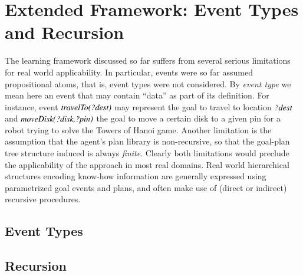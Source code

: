 \section{Extended Framework: Event Types and Recursion}\label{sec:extended}

 The learning framework discussed so far suffers from several serious limitations
for real world applicability.
In particular, events were so far assumed propositional atoms, that is, event
types were not considered. By \emph{event type} we mean here an event that may
contain ``data'' as part of its definition. For instance, event
${\mbox{\textit{travelTo(?dest)}}}$ may represent the goal to travel to location
${\mbox{\textit{?dest}}}$ and ${\mbox{\textit{moveDisk(?disk,?pin)}}}$ the goal to move a
certain disk to a given pin for a robot trying to solve the Towers of Hanoi game.
Another limitation is the assumption that the agent's plan library is
non-recursive, so that the goal-plan tree structure induced is always
\emph{finite}.
Clearly both limitations would preclude the applicability of the approach in
most real domains. Real world hierarchical structures encoding know-how information
are generally expressed using parametrized goal events and plans, and often make
use of (direct or indirect) recursive procedures.



\subsection{Event Types}



\subsection{Recursion}




